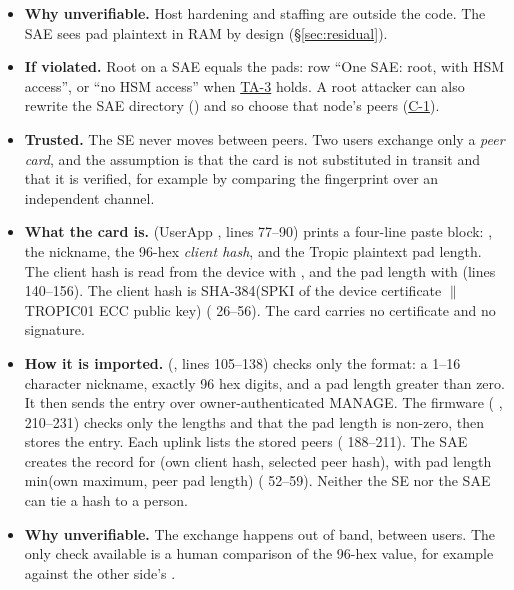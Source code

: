\documentclass[11pt,a4paper]{article}
\begin{document}
\begin{description}[style=nextline,leftmargin=1.2em]
\begin{itemize}
\item \textbf{Why unverifiable.} Host hardening and staffing are outside the code. The SAE sees pad plaintext in RAM by design (\S\ref{sec:residual}).
\item \textbf{If violated.} Root on a SAE equals the pads: row ``One SAE: root, with HSM access'', or ``no HSM access'' when \hyperref[ta:TA-3]{TA-3} holds. A root attacker can also rewrite the SAE directory () and so choose that node's peers (\hyperref[c:C-1]{C-1}).
\end{itemize}
\item[TA-7 Authentic peer-card exchange]\label{ta:TA-7}
\begin{itemize}
\item \textbf{Trusted.} The SE never moves between peers. Two users exchange only a \emph{peer card}, and the assumption is that the card is not substituted in transit and that it is verified, for example by comparing the fingerprint over an independent channel.
\item \textbf{What the card is.}  (UserApp , lines 77--90) prints a four-line paste block: , the nickname, the 96-hex \emph{client hash}, and the Tropic plaintext pad length. The client hash is read from the device with , and the pad length with  (lines 140--156). The client hash is SHA-384(SPKI of the device certificate $\|$ TROPIC01 ECC public key) ( 26--56). The card carries no certificate and no signature.
\item \textbf{How it is imported.}  (, lines 105--138) checks only the format: a 1--16 character nickname, exactly 96 hex digits, and a pad length greater than zero. It then sends the entry over owner-authenticated MANAGE. The firmware ( , 210--231) checks only the lengths and that the pad length is non-zero, then stores the entry. Each  uplink lists the stored peers ( 188--211). The SAE creates the record for (own client hash, selected peer hash), with pad length min(own maximum, peer pad length) ( 52--59). Neither the SE nor the SAE can tie a hash to a person.
\item \textbf{Why unverifiable.} The exchange happens out of band, between users. The only check available is a human comparison of the 96-hex value, for example against the other side's .

\end{itemize}
\end{description}
\end{document}
